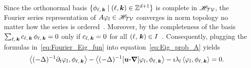 \documentclass[amsa]{ipart}
\begin{document}
Since the orthonormal basis
$\{\phi_{\ell,\,\boldsymbol{k}} \;|\; (\ell,\boldsymbol{k})\in\mathbb{Z}^{d+1}\}$ is complete
in $\mathscr{H}_{\mathcal{T}\mathcal{V}}$, the Fourier series representation of 
$A\varphi_l\in\mathscr{H}_{\mathcal{T}\mathcal{V}}$ converges in norm topology no matter how the
series is ordered~\cite{Folland:99:RealAnalysis}. Moreover, by the 
completeness of the basis 
$\sum_{\ell,\,\boldsymbol{k}}c_{\ell,\,\boldsymbol{k}}\,\phi_{\ell,\,\boldsymbol{k}}=0$ only if
$c_{\ell,\,\boldsymbol{k}}=0$ for all
$(\ell,\,\boldsymbol{k})\in I$~\cite{Folland:99:RealAnalysis}. Consequently,
plugging the formulas in~\eqref{eq:Fourier_Eig_fun}
into equation~\eqref{eq:Eig_prob_A} yields
%
\begin{align}\label{eq:Coeff_Eqn}
  \left\langle(-\Delta)^{-1}\partial_t\varphi_l,\phi_{\ell,\,\veck}\right\rangle
  -\left\langle(-\Delta)^{-1}[\vecu\bcdot\bnabla]\varphi_l,\phi_{\ell,\,\veck}\right\rangle
  -\imath\lambda_l\left\langle\varphi_l,\phi_{\ell,\,\veck}\right\rangle
  =0.
\end{align}
%
\end{document}
